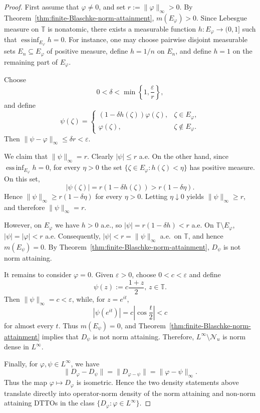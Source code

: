 \documentclass[10pt,a4paper]{amsart}
\def \T{\mathbb{T}}
\newcommand{\vp}{\varphi}
\begin{document}
\begin{proof}
First assume that $\vp\neq0$, and set $r:=\|\vp\|_\infty>0$. By Theorem~\ref{thm:finite-Blaschke-norm-attainment}, $m(E_\vp)>0$. Since Lebesgue measure on $\T$ is nonatomic, there exists a measurable function $h:E_\vp\to(0,1]$ such that $\operatorname*{ess\,inf}_{E_\vp}h=0$. For instance, one may choose
pairwise disjoint measurable sets $E_n\subseteq E_\vp$ of positive
measure, define $h=1/n$ on $E_n$, and define $h=1$ on the remaining
part of $E_\vp$.
	
Choose
\[
0<\delta<\min\left\{1,\frac{\varepsilon}{r}\right\},
\]
and define
\[
\psi(\zeta)=
\begin{cases}
(1-\delta h(\zeta))\vp(\zeta),
& \zeta\in E_\vp,\\
\vp(\zeta),
& \zeta\notin E_\vp.
\end{cases}
\]
Then $\|\psi-\vp\|_\infty\leq\delta r<\varepsilon$.
	
We claim that $\|\psi\|_\infty=r$. Clearly $|\psi|\leq r$ a.e.
On the other hand, since $\operatorname*{ess\,inf}_{E_\vp}h=0$, for every $\eta>0$ the set $\{\zeta\in E_\vp:h(\zeta)<\eta\}$ has positive measure. On this set,
\[
|\psi(\zeta)|=r(1-\delta h(\zeta))>r(1-\delta\eta).
\]
Hence $\|\psi\|_\infty\geq r(1-\delta\eta)$ for every $\eta>0$.
Letting $\eta\downarrow0$ yields $\|\psi\|_\infty\geq r$, and therefore $\|\psi\|_\infty=r$.
	
However, on $E_\vp$ we have $h>0$ a.e., so $|\psi|=r(1-\delta h)<r$ a.e. On $\T\setminus E_\vp$, $|\psi|=|\vp|<r$ a.e. Consequently,
$|\psi|<r=\|\psi\|_\infty$ a.e.\ on $\T$, and hence $m(E_\psi)=0$. By
Theorem~\ref{thm:finite-Blaschke-norm-attainment}, $D_\psi$ is not norm attaining.
	
It remains to consider $\vp=0$. Given $\varepsilon>0$, choose
$0<c<\varepsilon$ and define
\[
\psi(z):=c\frac{1+z}{2},\, z\in \T.
\]
Then $\|\psi\|_\infty=c<\varepsilon$, while, for $z=e^{it}$,
\[
|\psi(e^{it})|=c\left|\cos\frac{t}{2}\right|<c
\]
for almost every $t$. Thus $m(E_\psi)=0$, and Theorem~\ref{thm:finite-Blaschke-norm-attainment} implies that
$D_\psi$ is not norm attaining. Therefore, $L^\infty\setminus\mathcal{N}_u$ is norm dense in $L^\infty$.
	
Finally, for $\vp,\psi\in L^\infty$, we have
\[
\|D_\vp-D_\psi\|=\|D_{\vp-\psi}\|=\|\vp-\psi\|_\infty.
\]
Thus the map $\vp\mapsto D_\vp$ is isometric. Hence the two density
statements above translate directly into operator-norm density of the
norm attaining and non-norm attaining DTTOs in the class $\{D_\vp:\vp\in L^\infty\}$.
\end{proof}
\end{document}
